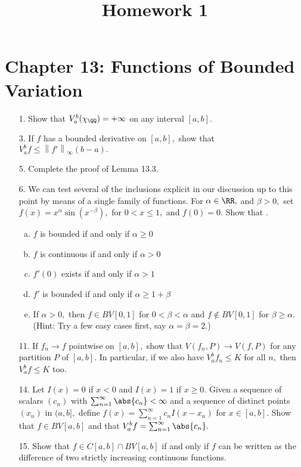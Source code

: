 \documentclass{article}
\begin{document}
\title{Homework 1}
\maketitle
\thispagestyle{fancy}

\section*{Chapter 13: Functions of Bounded Variation}

\begin{itemize}
	\item[1.] Show that $V_a^b(\chi_\QQ)=+\infty$ on any interval $[a, b].$

	\item[3.] If $f$ has a bounded derivative on $[a, b],$ show that $V_a^b f\le \left\lVert f' \right\rVert_\infty(b-a).$

	\item[5.] Complete the proof of Lemma 13.3.

	\item[6.] We can test several of the inclusions explicit in our discussion up to this point by means of a single family of functions. For $\alpha\in\RR,$ and $\beta>0,$ set $f(x)=x^\alpha \sin(x^{-\beta}),$ for $0<x\le 1,$ and $f(0)=0.$ Show that
		.\begin{enumerate}[(a)]
			\item $f$ is bounded if and only if $\alpha\ge 0$

			\item $f$ is continuous if and only if $\alpha>0$

			\item $f'(0)$ exists if and only if $\alpha>1$

			\item $f'$ is bounded if and only if $\alpha\ge 1+\beta$

			\item If $\alpha>0,$ then $f\in BV[0, 1]$ for $0<\beta<\alpha$ and $f\not\in BV[0, 1]$ for $\beta\ge \alpha.$ (Hint: Try a few easy cases first, say $\alpha=\beta=2.$)

		\end{enumerate}

	\item[11.] If $f_n\to f$ pointwise on $[a, b],$ show that $V(f_n, P)\to V(f, P)$ for any partition $P$ of $[a, b].$ In particular, if we also have $V_a^b f_n \le K$ for all $n,$ then $V_a^b f\le K$ too.

	\item[14.] Let $I(x)=0$ if $x<0$ and $I(x)=1$ if $x\ge 0.$ Given a sequence of scalars $(c_n)$ with $\sum_{n=1}^{\infty}\abs{c_n}<\infty$ and a sequence of distinct points $(x_n)$ in $(a, b],$ define $f(x)=\sum_{n=1}^{\infty} c_nI(x-x_n)$ for $x\in[a, b].$ Show that $f\in BV[a, b]$ and that $V_a^bf=\sum_{n=1}^{\infty} \abs{c_n}.$

	\item[15.] Show that $f\in C[a, b]\cap BV[a, b]$ if and only if $f$ can be written as the difference of two strictly increasing continuous functions.
		
\end{itemize}
\end{document}

